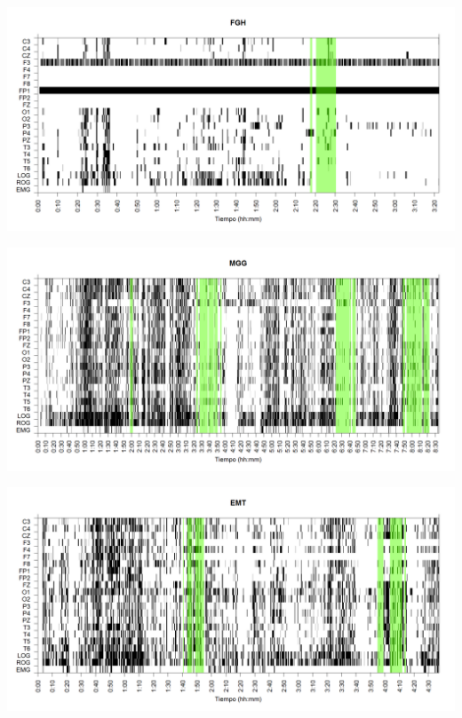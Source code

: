 
\begin{SidewaysFigure}
\centering
\includegraphics[width=\linewidth]
{./grafiquitos170404/FGHSUE_est.png} 
\caption{Sujeto: FGH | Total \'epocas: 405 | \'Epocas MOR: 22
}
\label{FGH}
\end{SidewaysFigure}


\begin{SidewaysFigure}
\centering
\includegraphics[width=\linewidth]
{./grafiquitos170404/MGNA5SUE_est.png} 
\caption{Sujeto: MGG | Total \'epocas: 1030 | \'Epocas MOR: 166
}
\label{MGG}
\end{SidewaysFigure}


\begin{SidewaysFigure}
\centering
\includegraphics[width=\linewidth]
{./grafiquitos170404/EMNNS_est.png} 
\caption{Sujeto: EMT | Total \'epocas: 555 | \'Epocas MOR: 47
}
\label{EMT}
\end{SidewaysFigure}

